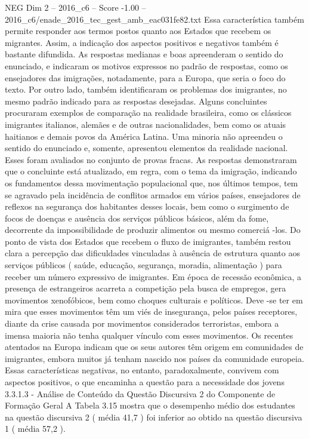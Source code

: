 \begin{textsample}{NEG Dim 2 – 2016\_c6 – Score -1.00 – 2016\_c6/enade\_2016\_tec\_gest\_amb\_eac031fe82.txt}
Essa característica também permite responder aos termos postos quanto aos Estados que recebem os migrantes.
Assim, a indicação dos aspectos positivos e negativos também é bastante difundida.
As respostas medianas e boas apreenderam o sentido do enunciado, e indicaram os motivos expressos no padrão de respostas, como os ensejadores das imigrações, notadamente, para a Europa, que seria o foco do texto.
Por outro lado, também identificaram os problemas dos imigrantes, no mesmo padrão indicado para as respostas desejadas.
Alguns concluintes procuraram exemplos de comparação na realidade brasileira, como os clássicos imigrantes italianos, alemães e de outras nacionalidades, bem como os atuais haitianos e demais povos da América Latina.
Uma minoria não apreendeu o sentido do enunciado e, somente, apresentou elementos da realidade nacional.
Esses foram avaliados no conjunto de provas fracas.
As respostas demonstraram que o concluinte está atualizado, em regra, com o tema da imigração, indicando os fundamentos dessa movimentação populacional que, nos últimos tempos, tem se agravado pela incidência de conflitos armados em vários países, ensejadores de reflexos na segurança dos habitantes desses locais, bem como o surgimento de focos de doenças e ausência dos serviços públicos básicos, além da fome, decorrente da impossibilidade de produzir alimentos ou mesmo comerciá -los.
Do ponto de vista dos Estados que recebem o fluxo de imigrantes, também restou clara a percepção das dificuldades vinculadas à ausência de estrutura quanto aos serviços públicos ( saúde, educação, segurança, moradia, alimentação ) para receber um número expressivo de imigrantes.
Em época de recessão econômica, a presença de estrangeiros acarreta a competição pela busca de empregos, gera movimentos xenofóbicos, bem como choques culturais e políticos.
Deve -se ter em mira que esses movimentos têm um viés de insegurança, pelos países receptores, diante da crise causada por movimentos considerados terroristas, embora a imensa maioria não tenha qualquer vínculo com esses movimentos.
Os recentes atentados na Europa indicam que os seus autores têm origem em comunidades de imigrantes, embora muitos já tenham nascido nos países da comunidade europeia.
Essas características negativas, no entanto, paradoxalmente, convivem com aspectos positivos, o que encaminha a questão para a necessidade dos jovens 3.3.1.3 - Análise de Conteúdo da Questão Discursiva 2 do Componente de Formação Geral A Tabela 3.15 mostra que o desempenho médio dos estudantes na questão discursiva 2 ( média 41,7 ) foi inferior ao obtido na questão discursiva 1 ( média 57,2 ).

\end{textsample}
